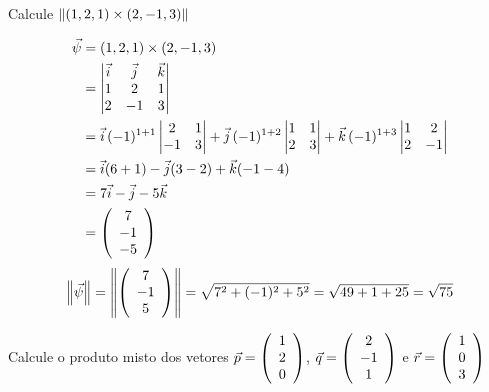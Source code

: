 \documentclass[a4paper,12pt,fleqn]{article}
\begin{document}
Calcule
\(
  \norm{(1,  2, 1) \times (2, -1, 3)}
\)
\begin{answer}
  \begin{align*}
    \vec{\psi}
    & = (1,  2, 1) \times (2, -1, 3) \\
    & = \begin{vmatrix}
          \vec{i} & \vec{j} & \vec{k} \\
          1        & 2        & 1       \\
          2        & -1       & 3
        \end{vmatrix}
    \\
    & = \vec{i}\, (-1)^{1+1}
        \begin{vmatrix}
          2 & 1 \\
          -1 & 3
        \end{vmatrix}
      + \vec{j}\, (-1)^{1+2}
        \begin{vmatrix}
          1 & 1 \\
          2 & 3
        \end{vmatrix}
      + \vec{k}\, (-1)^{1+3}
        \begin{vmatrix}
          1 & 2 \\
          2 & -1
        \end{vmatrix}
    \\
    & = \vec{i} (6 + 1)
      - \vec{j} (3 - 2)
      + \vec{k} (-1 -4) \\
    & = 7\vec{i} - \vec{j} -5\vec{k} \\
    & = \left(\begin{array}{c} 7 \\ -1 \\ -5 \end{array}\right)
  \end{align*}
  \[
    \norm{\vec{\psi}}
    = \norm{\vetortri{7}{-1}{5}}
    = \sqrt{7^2 + (-1)^2 + 5^2}
    = \sqrt{49 + 1 + 25}
    = \sqrt{75}
  \]
\end{answer}

Calcule o produto misto dos vetores
\(
  \vec{p} = \left(\begin{array}{c} 1 \\ 2 \\ 0 \end{array}\right)
\),
\(
  \vec{q} = \left(\begin{array}{c} 2 \\ -1 \\ 1 \end{array}\right)
\) e
\(
  \vec{r} = \left(\begin{array}{c} 1 \\ 0 \\ 3 \end{array}\right)
\)
\end{document}
